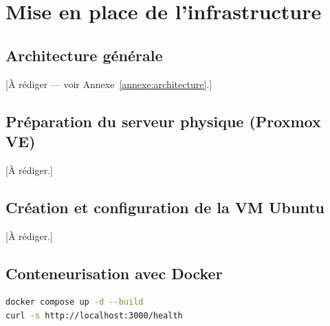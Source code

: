 \chapter{Mise en place de l'infrastructure}
\label{chap:infra}

\section{Architecture générale}
[À rédiger — voir Annexe~\ref{annexe:architecture}.]

\section{Préparation du serveur physique (Proxmox VE)}
[À rédiger.]

\section{Création et configuration de la VM Ubuntu}
[À rédiger.]

\section{Conteneurisation avec Docker}
\begin{lstlisting}[language=bash,caption={Exemple de démarrage d'un service},label={lst:compose-up}]
docker compose up -d --build
curl -s http://localhost:3000/health
\end{lstlisting}

\clearpage
